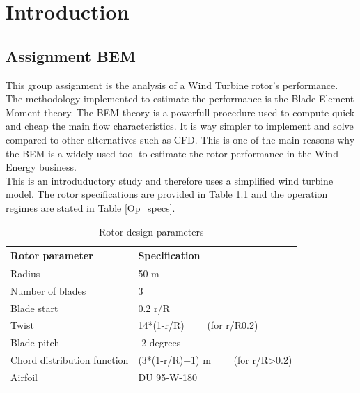 \chapter{Introduction}

\section{Assignment BEM }

This group assignment is the analysis of a Wind Turbine rotor's performance. The methodology implemented to estimate the performance is the Blade Element Moment theory. The BEM theory is a powerfull procedure used to compute quick and cheap the main flow characteristics. It is way simpler to implement and solve compared to other alternatives such as CFD. This is one of the main reasons why the BEM is a widely used tool to estimate the rotor performance in the Wind Energy business. \\

This is an introduductory study and therefore uses a simplified wind turbine model. The rotor specifications are provided in Table \ref{Rot_specs} and the operation regimes are stated in Table \ref{Op_specs}.

\begin{table} [htbp]
\centering
\caption{Rotor design parameters}
\begin{tabular}{|l|l|} 
\hline
\textbf{Rotor parameter}    & \textbf{Specification}                             \\ 
\hline
Radius                      & 50 m                                               \\ 
\hline
Number of blades            & 3                                                  \\ 
\hline
Blade start                 & 0.2 r/R                                            \\ 
\hline
Twist                       & 14*(1-r/R)~~~~ (for r/R0.2)                       \\ 
\hline
Blade pitch                 & -2 degrees                                         \\ 
\hline
Chord distribution function & (3*(1-r/R)+1) m~~~~ (for r/R\textgreater{}0.2)   \\ 
\hline
Airfoil                     & DU 95-W-180                                        \\
\hline
\end{tabular}
\label{Rot_specs}
\end{table}  

